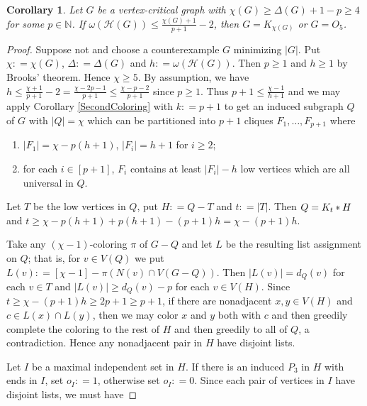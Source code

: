 \documentclass[12pt]{amsart}
\theoremstyle{plain}
\newtheorem{cor}[thm]{Corollary}
\theoremstyle{definition}
\theoremstyle{remark}
\newcommand{\fancy}[1]{\mathcal{#1}}
\newcommand{\IN}{\mathbb{N}}
\newcommand{\card}[1]{\left|#1\right|}
\newcommand{\irange}[1]{\left[#1\right]}
\newcommand{\join}[2]{#1 \mbox{\hspace{2 pt}$\ast$\hspace{2 pt}} #2}
\newcommand{\DefinedAs}{\mathrel{\mathop:}=}
\begin{document}
	\begin{cor}\label{ThirdColoring}
	Let $G$ be a vertex-critical graph with $\chi(G) \geq \Delta(G) + 1 - p \geq 4$
	for some $p \in \IN$.  If $\omega(\fancy{H}(G)) \leq \frac{\chi(G) + 1}{p + 1} - 2$,
	then $G = K_{\chi(G)}$ or $G = O_5$.
	\end{cor}
	\begin{proof}
	Suppose not and choose a counterexample $G$ minimizing $\card{G}$.  Put
	$\chi \DefinedAs \chi(G)$, $\Delta \DefinedAs \Delta(G)$ and $h \DefinedAs
	\omega(\fancy{H}(G))$. Then $p \geq 1$ and $h \geq 1$ by Brooks' theorem. Hence
	$\chi \geq 5$. By assumption, we have $h \leq \frac{\chi + 1}{p+1} - 2 =
	\frac{\chi - 2p - 1}{p + 1} \leq \frac{\chi - p - 2}{p + 1}$ since $p \geq 1$. 
	Thus $p + 1 \leq \frac{\chi - 1}{h + 1}$ and we may apply Corollary
	\ref{SecondColoring} with $k \DefinedAs p + 1$ to get an induced subgraph $Q$ of
	$G$ with $\card{Q} = \chi$ which can be partitioned into $p + 1$ cliques $F_1,
	\ldots, F_{p + 1}$ where
			\begin{enumerate}
					\item $\card{F_1} = \chi - p(h + 1)$, $\card{F_i} = h	+ 1$ for $i \geq 2$;
					\item for each $i \in \irange{p+1}$, $F_i$ contains at least $\card{F_i} -
					h$ low vertices which are all universal in $Q$.
			\end{enumerate}
Let $T$ be the low vertices in $Q$, put $H \DefinedAs Q - T$ and $t
\DefinedAs \card{T}$.  Then $Q = \join{K_t}{H}$ and $t \geq \chi - p(h + 1) +
p(h + 1) - (p + 1)h = \chi - (p + 1)h$.  

Take any $(\chi - 1)$-coloring $\pi$ of $G-Q$ and let $L$ be the resulting list
assignment on $Q$; that is, for $v \in V(Q)$ we put $L(v) \DefinedAs \irange{\chi - 1} - \pi(N(v) \cap V(G-Q))$.  Then $\card{L(v)} = d_Q(v)$ for each $v \in T$ and
$\card{L(v)} \geq d_Q(v) - p$ for each $v \in V(H)$.  Since $t \geq \chi - (p +
1)h \geq 2p + 1 \geq p + 1$, if there are nonadjacent $x,y \in V(H)$ and $c \in
L(x) \cap L(y)$, then we may color $x$ and $y$ both with $c$ and then greedily
complete the coloring to the rest of $H$ and then greedily to all of $Q$, a
contradiction.  Hence any nonadjacent pair in $H$ have disjoint lists.

Let $I$ be a maximal independent set in $H$. If there is an induced $P_3$
in $H$ with ends in $I$, set $o_I \DefinedAs 1$, otherwise set $o_I
\DefinedAs 0$. Since each pair of vertices in $I$ have disjoint lists, we must
have


\end{proof}
\end{document}
